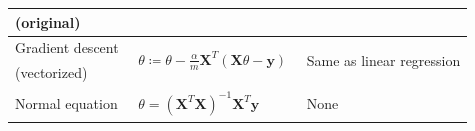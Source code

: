 \begin{table}[H]
\begin{tabular}[t]{lll}
        (original)       &                                                                                                                                                                                 &                                                                                                                                                              \\
        \hline 
        Gradient descent & \multirow{2}{*}{$\begin{array}{l} \theta  \coloneqq \theta - \frac{\alpha}{m}\mathbf{X}^T\left(\mathbf{X}\theta-\mathbf{y}\right) \end{array}$}                                 & \multirow{2}{*}{Same as linear regression}                                                                                                                   \\
        (vectorized)     &                                                                                                                                                                                 &                                                                                                                                                              \\ 
        \hline 
        Normal equation  & $\begin{array}{l} \theta = \left(\mathbf{X}^T\mathbf{X}\right)^{-1}\mathbf{X}^T\mathbf{y} \end{array}$                                                                          & None                                                                                                                                                         \\ 
        \hline
        \hline
    \end{tabular}
\end{table}